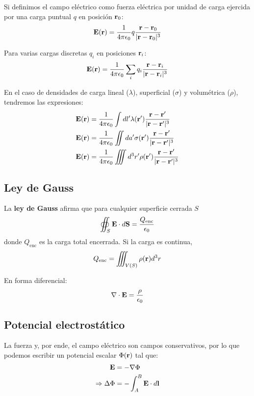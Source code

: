 \documentclass[]{article}
\numberwithin{equation}{section}
\begin{document}
Si definimos el campo eléctrico como fuerza eléctrica por unidad de carga ejercida por una carga puntual \(q\) en posición \(\mathbf{r}_0\):
\begin{equation}
	\mathbf{E}(\rv) = \ke q\frac{\rv - \rv_0}{|\rv - \rv_0|^3}
\end{equation}

Para varias cargas discretas \(q_i\) en posiciones \(\mathbf{r}_i\):
\begin{equation}
	\mathbf{E}(\rv) = \ke \sum_{i}q_i\frac{\rv - \rv_i}{|\rv - \rv_i|^3}
\end{equation}

En el caso de densidades de carga lineal (\(\lambda\)), superficial (\(\sigma\)) y volumétrica (\(\rho\)), tendremos las expresiones:
\begin{align}
	\mathbf{E}(\rv) &= \ke \int dl'\lambda(\rv')\frac{\rv - \rv'}{|\rv - \rv'|^3}\\
	\mathbf{E}(\rv) &= \ke \iint da'\sigma(\rv')\frac{\rv - \rv'}{|\rv - \rv'|^3}\\
	\mathbf{E}(\rv) &= \ke \iiint d^3r'\rho(\rv')\frac{\rv - \rv'}{|\rv - \rv'|^3}
\end{align}

\subsection{Ley de Gauss}
La \textbf{ley de Gauss} afirma que para cualquier superficie cerrada \(S\)
\begin{equation}
	\oiint_{S} \mathbf{E}\cdot d\mathbf{S} = \frac{Q_{\text{enc}}}{\epsilon_{0}}
\end{equation}
donde \(Q_{\text{enc}}\) es la carga total encerrada. Si la carga es continua,
\begin{equation*}
	Q_{\text{enc}} = \iiint_{V(S)} \rho(\mathbf{r}) d^3r
\end{equation*}

En forma diferencial:
\begin{equation}
	\nabla\cdot\mathbf{E} = \frac{\rho}{\epsilon_{0}}
\end{equation}

\subsection{Potencial electrostático}
La fuerza y, por ende, el campo eléctrico son campos conservativos, por lo que podemos escribir un potencial escalar \(\Phi(\mathbf{r})\) tal que:
\begin{align}
	\mathbf{E} &= -\nabla\Phi\\
	\Rightarrow \Delta\Phi &= -\int_{A}^{B} \mathbf{E}\cdot d\mathbf{l}
\end{align}
\end{document}
